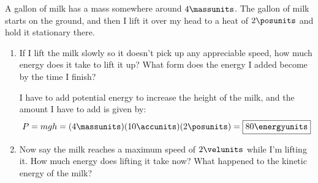A gallon of milk has a mass somewhere around $4\massunits$. The gallon of milk starts on the ground, and then I lift it over my head to a heat of $2\posunits$ and hold it stationary there.
\setcounter{equation}{0}
\begin{enumerate}
\ifsolution
\else
\setlength\itemsep{7cm}
\fi

\item If I lift the milk slowly so it doesn't pick up any appreciable speed, how much energy does it take to lift it up? What form does the energy I added become by the time I finish?
\begin{solution}
  I have to add potential energy to increase the height of the milk, and the amount I have to add is given by:
  \begin{equation}
    P = mgh = (4\massunits)(10\accunits)(2\posunits) = \boxed{80\energyunits}
  \end{equation}
\end{solution}

\item Now say the milk reaches a maximum speed of $2\velunits$ while I'm lifting it. How much energy does lifting it take now? What happened to the kinetic energy of the milk?

\end{enumerate}
